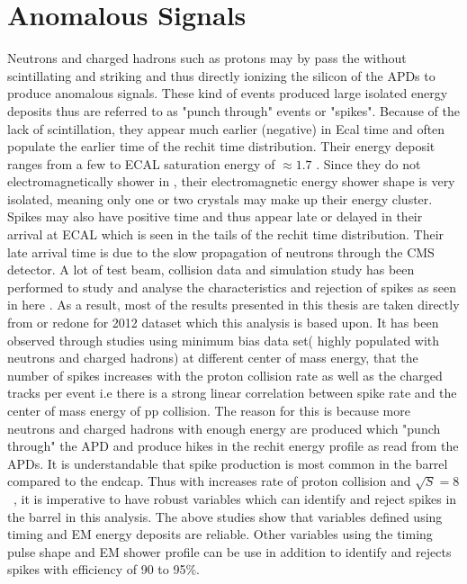 \section{Anomalous Signals}
Neutrons and charged hadrons such as protons may by pass the \pb without scintillating and striking and thus directly ionizing the silicon of the APDs to produce anomalous signals. These kind of events produced large isolated energy deposits thus are referred to as "punch through" events or "spikes". Because of the lack of scintillation, they appear much earlier (negative) in Ecal time and often populate the earlier time of the rechit time distribution. Their energy deposit ranges from a few \GeV to ECAL saturation energy of $\approx 1.7$ \TeV. Since they do not electromagnetically shower in \pb, their electromagnetic energy shower shape is  very isolated, meaning only one or two crystals may make up their energy cluster. Spikes may also have positive time and thus appear late or delayed in their arrival at ECAL which is seen in the tails of the rechit time distribution. Their late arrival time is due to the slow propagation of neutrons through the CMS detector.
A lot of test beam, collision data and simulation study has been performed to study and analyse the characteristics and rejection of spikes as seen in here \cite{spike}. 
As a result, most of the results presented in this thesis are taken directly from \cite{spike} or redone for 2012 dataset which this analysis is based upon. It has been observed through studies using minimum bias data set( highly populated with neutrons and  charged hadrons) at different center of mass energy, that the number of spikes increases with the proton collision rate as well as the charged tracks per event i.e there is a strong linear correlation between spike rate and the center of mass energy of pp collision. The reason for this is because more neutrons and charged hadrons with enough energy are produced which "punch through" the APD and produce hikes in the rechit energy profile as read from the APDs. It is understandable that spike production is most common in the barrel compared to the endcap. Thus with increases rate of proton collision and  $\sqrt{S} = 8$~\TeV, it is imperative to have robust variables which can identify and reject spikes in the barrel in this analysis.  
The  above studies show that variables defined using timing and EM energy deposits are reliable. Other variables using the timing pulse shape and EM shower profile can be use in addition to identify and rejects spikes with  efficiency of 90 to 95\%.
\newline
